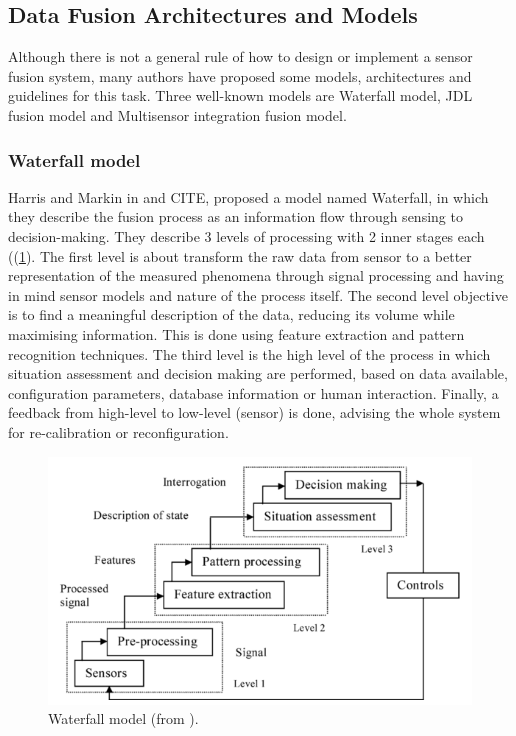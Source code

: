 \subsection{Data Fusion Architectures and Models}

Although there is not a general rule of how to design or implement a sensor fusion system, many authors have proposed some models, architectures and guidelines for this task. Three well-known models are Waterfall model, JDL fusion model and Multisensor integration fusion model.

\subsubsection{Waterfall model}

Harris and Markin in \cite{Harris1998} and CITE, proposed a model named Waterfall, in which they describe the fusion process as an information flow through sensing to decision-making. They describe 3 levels of processing with 2 inner stages each ((\ref{WaterfallModel}). The first level is about transform the raw data from sensor to a better representation of the measured phenomena through signal processing and having in mind sensor models and nature of the process itself. The second level objective is to find a meaningful description of the data, reducing its volume while maximising information. This is done using feature extraction and pattern recognition techniques. The third level is the high level of the process in which situation assessment and decision making are performed, based on data available, configuration parameters, database information or human interaction. Finally, a feedback from high-level to low-level (sensor) is done, advising the whole system for re-calibration or reconfiguration.

\begin{figure}[ht!]
\centering
\includegraphics[scale=0.4]{fig/2/WaterfallModel.png}
\caption{Waterfall model (from \cite{Esteban2005}).}
\label{WaterfallModel}
\end{figure}

